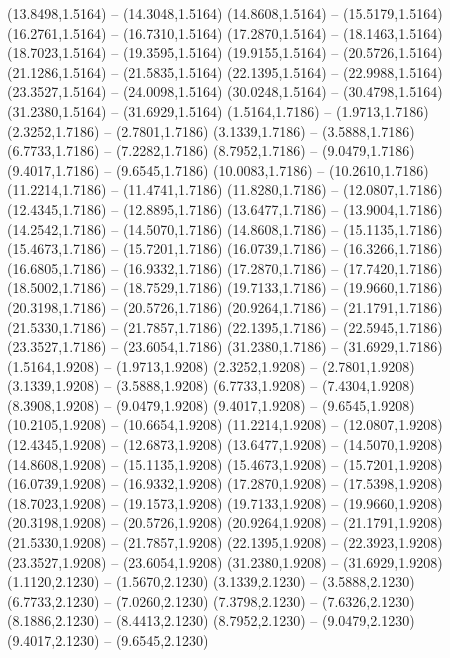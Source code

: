 {\begin{scope}[shift={(#1,#2)}]
    (13.8498,1.5164) -- (14.3048,1.5164)
    (14.8608,1.5164) -- (15.5179,1.5164)
    (16.2761,1.5164) -- (16.7310,1.5164)
    (17.2870,1.5164) -- (18.1463,1.5164)
    (18.7023,1.5164) -- (19.3595,1.5164)
    (19.9155,1.5164) -- (20.5726,1.5164)
    (21.1286,1.5164) -- (21.5835,1.5164)
    (22.1395,1.5164) -- (22.9988,1.5164)
    (23.3527,1.5164) -- (24.0098,1.5164)
    (30.0248,1.5164) -- (30.4798,1.5164)
    (31.2380,1.5164) -- (31.6929,1.5164)
    (1.5164,1.7186) -- (1.9713,1.7186)
    (2.3252,1.7186) -- (2.7801,1.7186)
    (3.1339,1.7186) -- (3.5888,1.7186)
    (6.7733,1.7186) -- (7.2282,1.7186)
    (8.7952,1.7186) -- (9.0479,1.7186)
    (9.4017,1.7186) -- (9.6545,1.7186)
    (10.0083,1.7186) -- (10.2610,1.7186)
    (11.2214,1.7186) -- (11.4741,1.7186)
    (11.8280,1.7186) -- (12.0807,1.7186)
    (12.4345,1.7186) -- (12.8895,1.7186)
    (13.6477,1.7186) -- (13.9004,1.7186)
    (14.2542,1.7186) -- (14.5070,1.7186)
    (14.8608,1.7186) -- (15.1135,1.7186)
    (15.4673,1.7186) -- (15.7201,1.7186)
    (16.0739,1.7186) -- (16.3266,1.7186)
    (16.6805,1.7186) -- (16.9332,1.7186)
    (17.2870,1.7186) -- (17.7420,1.7186)
    (18.5002,1.7186) -- (18.7529,1.7186)
    (19.7133,1.7186) -- (19.9660,1.7186)
    (20.3198,1.7186) -- (20.5726,1.7186)
    (20.9264,1.7186) -- (21.1791,1.7186)
    (21.5330,1.7186) -- (21.7857,1.7186)
    (22.1395,1.7186) -- (22.5945,1.7186)
    (23.3527,1.7186) -- (23.6054,1.7186)
    (31.2380,1.7186) -- (31.6929,1.7186)
    (1.5164,1.9208) -- (1.9713,1.9208)
    (2.3252,1.9208) -- (2.7801,1.9208)
    (3.1339,1.9208) -- (3.5888,1.9208)
    (6.7733,1.9208) -- (7.4304,1.9208)
    (8.3908,1.9208) -- (9.0479,1.9208)
    (9.4017,1.9208) -- (9.6545,1.9208)
    (10.2105,1.9208) -- (10.6654,1.9208)
    (11.2214,1.9208) -- (12.0807,1.9208)
    (12.4345,1.9208) -- (12.6873,1.9208)
    (13.6477,1.9208) -- (14.5070,1.9208)
    (14.8608,1.9208) -- (15.1135,1.9208)
    (15.4673,1.9208) -- (15.7201,1.9208)
    (16.0739,1.9208) -- (16.9332,1.9208)
    (17.2870,1.9208) -- (17.5398,1.9208)
    (18.7023,1.9208) -- (19.1573,1.9208)
    (19.7133,1.9208) -- (19.9660,1.9208)
    (20.3198,1.9208) -- (20.5726,1.9208)
    (20.9264,1.9208) -- (21.1791,1.9208)
    (21.5330,1.9208) -- (21.7857,1.9208)
    (22.1395,1.9208) -- (22.3923,1.9208)
    (23.3527,1.9208) -- (23.6054,1.9208)
    (31.2380,1.9208) -- (31.6929,1.9208)
    (1.1120,2.1230) -- (1.5670,2.1230)
    (3.1339,2.1230) -- (3.5888,2.1230)
    (6.7733,2.1230) -- (7.0260,2.1230)
    (7.3798,2.1230) -- (7.6326,2.1230)
    (8.1886,2.1230) -- (8.4413,2.1230)
    (8.7952,2.1230) -- (9.0479,2.1230)
    (9.4017,2.1230) -- (9.6545,2.1230)

\end{scope}}

